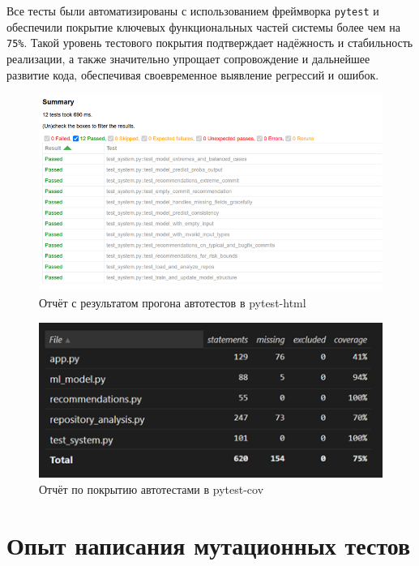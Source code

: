 Все тесты были автоматизированы с использованием фреймворка \texttt{pytest} и обеспечили покрытие ключевых функциональных частей системы более чем на \verb|75%|. Такой уровень тестового покрытия подтверждает надёжность и стабильность реализации, а также значительно упрощает сопровождение и дальнейшее развитие кода, обеспечивая своевременное выявление регрессий и ошибок.

\begin{figure}[ht]
	\centering
	\includegraphics[width=\textwidth]{my_folder/images/test_result.png}
	\caption{Отчёт с результатом прогона автотестов в pytest-html}
	\label{tab:test_pytest}
\end{figure}

\begin{figure}[ht]
	\centering
	\includegraphics[width=\textwidth]{my_folder/images/coverage.png}
	\caption{Отчёт по покрытию автотестами в pytest-cov}
	\label{tab:test_pytest2}
\end{figure}


\section{Опыт написания мутационных тестов}

